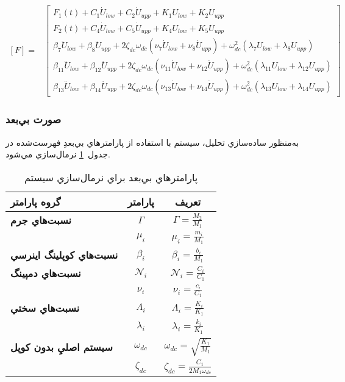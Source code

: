 \begin{equation}\label{Eq.force_vector_dimensional_combined}
\begin{aligned}
[F] = & \begin{bmatrix}
F_1(t) + C_1 \dot{U}_{low} + C_2 \dot{U}_{upp} + K_1 U_{low} + K_2 U_{upp} \\
F_2(t) + C_4 \dot{U}_{low} + C_5 \dot{U}_{upp} + K_4 U_{low} + K_5 U_{upp} \\
\beta_7 \ddot{U}_{low} + \beta_8 \ddot{U}_{upp} + 2 \zeta_{dc} \omega_{dc} (\nu_7 \dot{U}_{low} + \nu_8 \dot{U}_{upp}) + \omega_{dc}^2 (\lambda_7 U_{low} + \lambda_8 U_{upp}) \\
\beta_{11} \ddot{U}_{low} + \beta_{12} \ddot{U}_{upp} + 2 \zeta_{dc} \omega_{dc} (\nu_{11} \dot{U}_{low} + \nu_{12} \dot{U}_{upp}) + \omega_{dc}^2 (\lambda_{11} U_{low} + \lambda_{12} U_{upp}) \\
\beta_{13} \ddot{U}_{low} + \beta_{14} \ddot{U}_{upp} + 2 \zeta_{dc} \omega_{dc} (\nu_{13} \dot{U}_{low} + \nu_{14} \dot{U}_{upp}) + \omega_{dc}^2 (\lambda_{13} U_{low} + \lambda_{14} U_{upp})
\end{bmatrix}
\end{aligned}
\end{equation}

\subsubsection{صورت بي‌بعد}

به‌منظور ساده‌سازي تحليل، سيستم با استفاده از پارامترهاي بي‌بعدِ فهرست‌شده در جدول~\ref{Tab:dimensionless.table} نرمال‌سازي مي‌شود.

\begin{table}[h!]
\centering
\caption{پارامترهاي بي‌بعد براي نرمال‌سازي سيستم}
\label{Tab:dimensionless.table}
\begin{tabular}{lcc}
\toprule
\textbf{گروه پارامتر} & \textbf{پارامتر} & \textbf{تعريف} \\
\midrule
\textbf{نسبت‌هاي جرم} & \( \Gamma \) & \( \Gamma = \frac{M_2}{M_1} \) \\
 & \( \mu_i \) & \( \mu_i = \frac{m_i}{M_1} \) \\
\addlinespace
\textbf{نسبت‌هاي كوپلينگ اينرسي} & \( \beta_i \) & \( \beta_i = \frac{b_i}{M_1} \) \\
\addlinespace
\textbf{نسبت‌هاي دمپينگ} & \( \mathcal{N}_i \) & \( \mathcal{N}_i = \frac{C_i}{C_1} \) \\
 & \( \nu_i \) & \( \nu_i = \frac{c_i}{C_1} \) \\
\addlinespace
\textbf{نسبت‌هاي سختي} & \( \Lambda_i \) & \( \Lambda_i = \frac{K_i}{K_1} \) \\
 & \( \lambda_i \) & \( \lambda_i = \frac{k_i}{K_1} \) \\
\addlinespace
\textbf{سيستم اصليِ بدون كوپل} & \( \omega_{dc} \) & \( \omega_{dc} = \sqrt{\frac{K_1}{M_1}} \) \\
 & \( \zeta_{dc} \) & \( \zeta_{dc} = \frac{C_1}{2 M_1 \omega_{dc}} \) \\
\bottomrule
\end{tabular}
\end{table}

